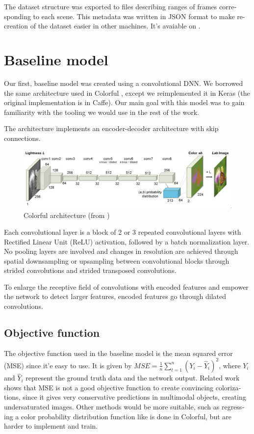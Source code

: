 \documentclass[12pt,openright,oneside,a4paper,english]{abntex2}
\begin{document}
\begin{otherlanguage}{english}
The dataset structure was exported to files describing ranges of frames corresponding to each scene. This metadata was written in JSON format to make re-creation of the dataset easier in other machines. It's avaiable on \cite{colormotion_dataset}.

\section{Baseline model}

Our first, baseline model was created using a convolutional DNN. We borrowed the same architecture used in Colorful \cite{colorful}, except we reimplemented it in Keras (the original implementation is in Caffe). Our main goal with this model was to gain familiarity with the tooling we would use in the rest of the work.

The architecture implements an encoder-decoder architecture with skip connections.

\begin{figure}[!htb]
\centering
\includegraphics[width=\textwidth]{Colorful}
\caption{Colorful architecture (from \cite{colorful})}
\label{colorful_architecture_paper}
\end{figure}

Each convolutional layer is a block of 2 or 3 repeated convolutional layers with Rectified Linear Unit (ReLU) activation, followed by a batch normalization layer. No pooling layers are involved and changes in resolution are achieved through spatial downsampling or upsampling between convolutional blocks through strided convolutions and strided transposed convolutions.

To enlarge the receptive field of convolutions with encoded features and empower the network to detect larger features, encoded features go through dilated convolutions.

\subsection{Objective function}

The objective function used in the baseline model is the mean squared error (MSE) since it'e easy to use. It is given by $MSE = \frac{1}{n}\sum_{t=1}^{n}(Y_i - \hat{Y}_i)^2$, where $Y_i$ and $\hat{Y}_i$ represent the ground truth data and the network output. Related work \cite{colorful} shows that MSE is not a good objective function to create convincing colorizations, since it gives very conservative predictions in multimodal objects, creating undersaturated images. Other methods would be more suitable, such as regressing a color probability distribution function like is done in Colorful, but are harder to implement and train.


\end{otherlanguage}
\end{document}
